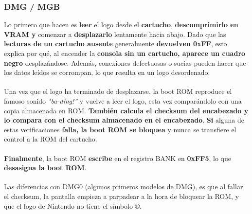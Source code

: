 \subsubsection{DMG / MGB}
Lo primero que hacen es \textbf{leer} el logo desde el \textbf{cartucho}, \textbf{descomprimirlo en VRAM y} comenzar a \textbf{desplazarlo} lentamente hacia abajo. Dado que las \textbf{lecturas de un cartucho ausente} generalmente \textbf{devuelven 0xFF}, esto explica por qué, al encender la \textbf{consola sin un cartucho, aparece un cuadro negro} desplazándose. Además, conexiones defectuosas o sucias pueden hacer que los datos leídos se corrompan, lo que resulta en un logo desordenado.
\\\\
Una vez que el logo ha terminado de desplazarse, la boot ROM reproduce el famoso sonido \textit{"ba-ding!”} y vuelve a leer el logo, esta vez comparándolo con una copia almacenada en ROM. \textbf{También calcula el checksum del encabezado y lo compara con el checksum almacenado en el encabezado}. \textbf{Si} alguna de estas verificaciones \textbf{falla, la boot ROM se bloquea} y nunca se transfiere el control a la ROM del cartucho.
\\\\
\textbf{Finalmente}, la boot ROM \textbf{escribe} en el registro BANK en \textbf{0xFF5}, lo que \textbf{desasigna la boot ROM}.
\\\\
Las diferencias con DMG0 (algunos primeros modelos de DMG), es que al fallar el checksum, la pantalla empieza a parpadear a la hora de bloquear la ROM, y que el logo de Nintendo no tiene el símbolo ®.

